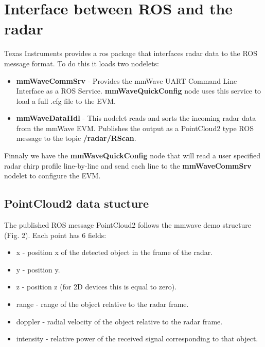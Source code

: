 \documentclass[12pt]{article}
\begin{document}
\section{Interface between ROS and the radar}
Texas Instruments provides a ros package that interfaces radar data to the ROS message format.
To do this it loads two nodelets:
\begin{itemize}
\item \textbf{mmWaveCommSrv} - Provides the mmWave UART Command Line Interface as a ROS Service. \textbf{mmWaveQuickConfig} node uses this service to load a full .cfg file to the EVM.
\item \textbf{mmWaveDataHdl} - This nodelet reads and sorts the incoming radar data from the mmWave EVM. Publishes the output as a PointCloud2 type ROS message to the topic \textbf{/radar/RScan}.
\end{itemize}

Finnaly we have the \textbf{mmWaveQuickConfig} node that will read a user specified radar chirp profile line-by-line and send each line to the \textbf{mmWaveCommSrv} nodelet to configure the EVM.
\
\subsection{PointCloud2 data stucture}

The published ROS message PointCloud2 follows the mmwave demo structure (Fig. 2). Each point has 6 fields:
\begin{itemize}
\item x - position x of the detected  object in the frame of the radar.
\item y - position y.
\item z - position z (for 2D devices this is equal to zero).
\item range - range of the object relative to the radar frame.
\item doppler - radial velocity of the object relative to the radar frame.
\item intensity - relative power of the received signal corresponding to that object.
\end{itemize}
\end{document}
